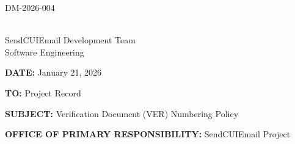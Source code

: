 \documentclass[11pt,letterpaper]{article}
\newcommand{\UniqueID}{DM-2026-004}
\newcommand{\DocumentDate}{January 21, 2026}
\newcommand{\AuthorName}{SendCUIEmail Development Team}
\newcommand{\AuthorTitle}{Software Engineering}
\newcommand{\ToField}{Project Record}
\newcommand{\SubjectField}{Verification Document (VER) Numbering Policy}
\newcommand{\OPRField}{SendCUIEmail Project}
\begin{document}
\hfill \UniqueID

\vspace{0.25in}

\underline{\hspace{2.5in}}\\[2pt]
\AuthorName\\
\AuthorTitle

\vspace{0.25in}

\textbf{DATE:} \DocumentDate

\textbf{TO:} \ToField

\textbf{SUBJECT:} \SubjectField

\textbf{OFFICE OF PRIMARY RESPONSIBILITY:} \OPRField

\vspace{0.25in}
\end{document}
